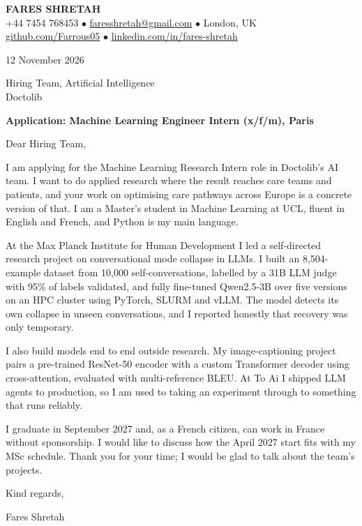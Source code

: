 \documentclass[11pt, a4paper]{article}
\begin{document}
\begin{center}
    {\huge \textbf{FARES SHRETAH}} \\[3pt]
    \small +44 7454 768453 $\bullet$ \href{mailto:faresshretah@gmail.com}{faresshretah@gmail.com} $\bullet$ London, UK \\
    \small \href{https://github.com/Farrous05}{github.com/Farrous05} $\bullet$ \href{https://www.linkedin.com/in/fares-shretah/}{linkedin.com/in/fares-shretah}
\end{center}

\vspace{6pt}
12 November 2026

Hiring Team, Artificial Intelligence \\
Doctolib

\textbf{Application: Machine Learning Engineer Intern (x/f/m), Paris}

Dear Hiring Team,

I am applying for the Machine Learning Research Intern role in Doctolib's AI team. I want to do applied research where the result reaches care teams and patients, and your work on optimising care pathways across Europe is a concrete version of that. I am a Master's student in Machine Learning at UCL, fluent in English and French, and Python is my main language.

At the Max Planck Institute for Human Development I led a self-directed research project on conversational mode collapse in LLMs. I built an 8,504-example dataset from 10,000 self-conversations, labelled by a 31B LLM judge with 95\% of labels validated, and fully fine-tuned Qwen2.5-3B over five versions on an HPC cluster using PyTorch, SLURM and vLLM. The model detects its own collapse in unseen conversations, and I reported honestly that recovery was only temporary.

I also build models end to end outside research. My image-captioning project pairs a pre-trained ResNet-50 encoder with a custom Transformer decoder using cross-attention, evaluated with multi-reference BLEU. At To Ai I shipped LLM agents to production, so I am used to taking an experiment through to something that runs reliably.

I graduate in September 2027 and, as a French citizen, can work in France without sponsorship. I would like to discuss how the April 2027 start fits with my MSc schedule. Thank you for your time; I would be glad to talk about the team's projects.

Kind regards,

Fares Shretah
\end{document}
